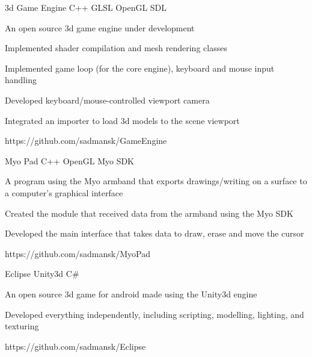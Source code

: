 



\begin{cvprojects}

\cvproject
{3d Game Engine}
{C++ \textbullet{} GLSL \textbullet{} OpenGL \textbullet{} SDL}
{
An open source 3d game engine under development
\begin{cvitems}
\item[]
\item {Implemented shader compilation and mesh rendering classes}
\item {Implemented game loop (for the core engine), keyboard and mouse input handling}
\item {Developed keyboard/mouse-controlled viewport camera} 
\item {Integrated an importer to load 3d models to the scene viewport} 
\end{cvitems}
}
{https://github.com/sadmansk/GameEngine}


\cvproject
{Myo Pad}
{C++ \textbullet{} OpenGL \textbullet{} Myo SDK}
{
A program using the Myo armband that exports drawings/writing on a surface to a computer's graphical interface 
\begin{cvitems}
\item[]
\item {Created the module that received data from the armband using the Myo SDK}
\item {Developed the main interface that takes data to draw, erase and move the cursor}
\end{cvitems}
}
{https://github.com/sadmansk/MyoPad}


\cvproject
{Eclipse}
{Unity3d \textbullet{} C\#}
{
An open source 3d game for android made using the Unity3d engine
\begin{cvitems}
\item[]
\item {Developed everything independently, including scripting, modelling, lighting, and texturing}
\end{cvitems}
}
{https://github.com/sadmansk/Eclipse}


\end{cvprojects}
